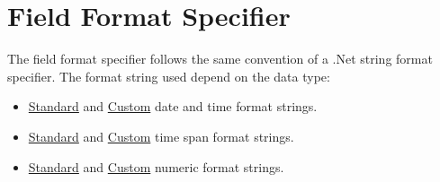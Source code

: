 \section{Field Format Specifier}

The field format specifier follows the same convention of a .Net string format specifier.  The format string used depend on the data type:

\begin{itemize}
    \item\href{https://docs.microsoft.com/en-us/dotnet/standard/base-types/standard-date-and-time-format-strings}{Standard} and \href{https://docs.microsoft.com/en-us/dotnet/standard/base-types/custom-date-and-time-format-strings}{Custom} date and time format strings.
    \item\href{https://docs.microsoft.com/en-us/dotnet/standard/base-types/standard-timespan-format-strings}{Standard} and \href{https://docs.microsoft.com/en-us/dotnet/standard/base-types/custom-timespan-format-strings}{Custom} time span format strings.
    \item\href{https://docs.microsoft.com/en-us/dotnet/standard/base-types/standard-numeric-format-strings}{Standard} and \href{https://docs.microsoft.com/en-us/dotnet/standard/base-types/custom-numeric-format-strings}{Custom} numeric format strings.
\end{itemize}




